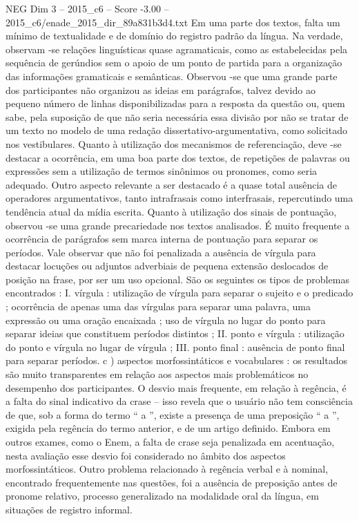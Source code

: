 \begin{textsample}{NEG Dim 3 – 2015\_c6 – Score -3.00 – 2015\_c6/enade\_2015\_dir\_89a831b3d4.txt}
Em uma parte dos textos, falta um mínimo de textualidade e de domínio do registro padrão da língua.
Na verdade, observam -se relações linguísticas quase agramaticais, como as estabelecidas pela sequência de gerúndios sem o apoio de um ponto de partida para a organização das informações gramaticais e semânticas.
Observou -se que uma grande parte dos participantes não organizou as ideias em parágrafos, talvez devido ao pequeno número de linhas disponibilizadas para a resposta da questão ou, quem sabe, pela suposição de que não seria necessária essa divisão por não se tratar de um texto no modelo de uma redação dissertativo-argumentativa, como solicitado nos vestibulares.
Quanto à utilização dos mecanismos de referenciação, deve -se destacar a ocorrência, em uma boa parte dos textos, de repetições de palavras ou expressões sem a utilização de termos sinônimos ou pronomes, como seria adequado.
Outro aspecto relevante a ser destacado é a quase total ausência de operadores argumentativos, tanto intrafrasais como interfrasais, repercutindo uma tendência atual da mídia escrita.
Quanto à utilização dos sinais de pontuação, observou -se uma grande precariedade nos textos analisados.
É muito frequente a ocorrência de parágrafos sem marca interna de pontuação para separar os períodos.
Vale observar que não foi penalizada a ausência de vírgula para destacar locuções ou adjuntos adverbiais de pequena extensão deslocados de posição na frase, por ser um uso opcional.
São os seguintes os tipos de problemas encontrados : I. vírgula : utilização de vírgula para separar o sujeito e o predicado ; ocorrência de apenas uma das vírgulas para separar uma palavra, uma expressão ou uma oração encaixada ; uso de vírgula no lugar do ponto para separar ideias que constituem períodos distintos ; II. ponto e vírgula : utilização do ponto e vírgula no lugar de vírgula ; III. ponto final : ausência de ponto final para separar períodos. c ) aspectos morfossintáticos e vocabulares : os resultados são muito transparentes em relação aos aspectos mais problemáticos no desempenho dos participantes.
O desvio mais frequente, em relação à regência, é a falta do sinal indicativo da crase – isso revela que o usuário não tem consciência de que, sob a forma do termo “ a ”, existe a presença de uma preposição “ a ”, exigida pela regência do termo anterior, e de um artigo definido.
Embora em outros exames, como o Enem, a falta de crase seja penalizada em acentuação, nesta avaliação esse desvio foi considerado no âmbito dos aspectos morfossintáticos.
Outro problema relacionado à regência verbal e à nominal, encontrado frequentemente nas questões, foi a ausência de preposição antes de pronome relativo, processo generalizado na modalidade oral da língua, em situações de registro informal.

\end{textsample}
